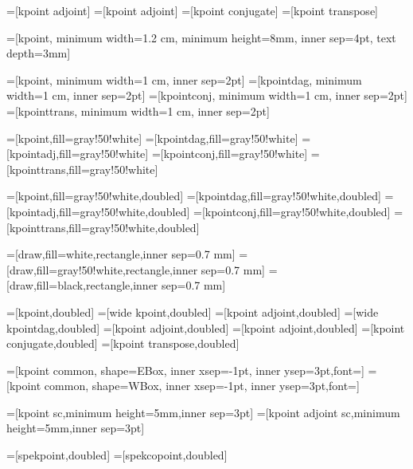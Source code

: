 =[kpoint adjoint]
=[kpoint adjoint]
=[kpoint conjugate]
=[kpoint transpose]

=[kpoint, minimum width=1.2 cm, minimum height=8mm, inner sep=4pt, text depth=3mm]

=[kpoint, minimum width=1 cm, inner sep=2pt]%
=[kpointdag, minimum width=1 cm, inner sep=2pt]%
=[kpointconj, minimum width=1 cm, inner sep=2pt]%
=[kpointtrans, minimum width=1 cm, inner sep=2pt]%

=[kpoint,fill=gray!50!white]
=[kpointdag,fill=gray!50!white]
=[kpointadj,fill=gray!50!white]
=[kpointconj,fill=gray!50!white]
=[kpointtrans,fill=gray!50!white]

=[kpoint,fill=gray!50!white,doubled]
=[kpointdag,fill=gray!50!white,doubled]
=[kpointadj,fill=gray!50!white,doubled]
=[kpointconj,fill=gray!50!white,doubled]
=[kpointtrans,fill=gray!50!white,doubled]

=[draw,fill=white,rectangle,inner sep=0.7 mm]
=[draw,fill=gray!50!white,rectangle,inner sep=0.7 mm]
=[draw,fill=black,rectangle,inner sep=0.7 mm]

=[kpoint,doubled]
=[wide kpoint,doubled]
=[kpoint adjoint,doubled]
=[wide kpointdag,doubled]
=[kpoint adjoint,doubled]
=[kpoint adjoint,doubled]
=[kpoint conjugate,doubled]
=[kpoint transpose,doubled]

=[kpoint common, shape=EBox, inner xsep=-1pt, inner ysep=3pt,font=\small]
=[kpoint common, shape=WBox, inner xsep=-1pt, inner ysep=3pt,font=\small]

=[kpoint sc,minimum height=5mm,inner sep=3pt]
=[kpoint adjoint sc,minimum height=5mm,inner sep=3pt]

=[spekpoint,doubled]
=[spekcopoint,doubled]

